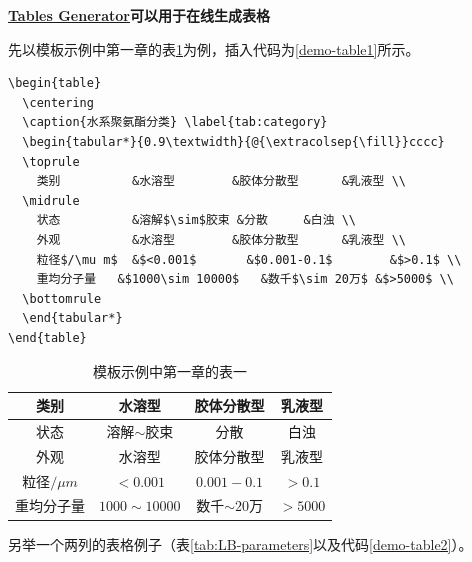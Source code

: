 \textbf{\href{https://www.tablesgenerator.com/}{Tables Generator}可以用于在线生成表格}

先以模板示例中第一章的表\ref{tab:category}为例，插入代码为\ref{demo-table1}所示。

\begin{lstlisting}[language={[LaTeX]TeX}, caption={示例插表代码}, label=demo-table1]
\begin{table}
  \centering
  \caption{水系聚氨酯分类} \label{tab:category}
  \begin{tabular*}{0.9\textwidth}{@{\extracolsep{\fill}}cccc}
  \toprule
    类别			&水溶型		&胶体分散型		&乳液型 \\
  \midrule
    状态			&溶解$\sim$胶束	&分散		&白浊 \\
    外观			&水溶型		&胶体分散型		&乳液型 \\
    粒径$/\mu m$	&$<0.001$		&$0.001-0.1$		&$>0.1$ \\
    重均分子量	&$1000\sim 10000$	&数千$\sim 20万$ &$>5000$ \\
  \bottomrule
  \end{tabular*}
\end{table}
\end{lstlisting}

\begin{table}
  \centering
  \caption{模板示例中第一章的表一} \label{tab:category}
  \begin{tabular*}{0.9\textwidth}{@{\extracolsep{\fill}}cccc}
  \toprule
    类别			&水溶型		&胶体分散型		&乳液型 \\
  \midrule
    状态			&溶解$\sim$胶束	&分散		&白浊 \\
    外观			&水溶型		&胶体分散型		&乳液型 \\
    粒径$/\mu m$	&$<0.001$		&$0.001-0.1$		&$>0.1$ \\
    重均分子量	&$1000\sim 10000$	&数千$\sim 20$万 &$>5000$ \\
  \bottomrule
  \end{tabular*}
\end{table}

另举一个两列的表格例子（表\ref{tab:LB-parameters}以及代码\ref{demo-table2}）。


